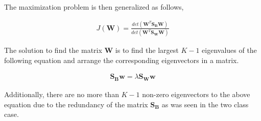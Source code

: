 \documentclass[11pt, a4paper]{article}
\begin{document}
The maximization problem is then generalized as follows,

\begin{align*}
	J(\boldsymbol{W}) = \frac{det(\boldsymbol{W}^T \boldsymbol{S_B} \boldsymbol{W})}{det(\boldsymbol{W}^T \boldsymbol{S_W} \boldsymbol{W})} 
\end{align*}

The solution to find the matrix $\boldsymbol{W}$ is to find the largest $K-1$ eigenvalues of the following equation and arrange the corresponding eigenvectors in a matrix. 

\begin{align*}
	\boldsymbol{S_B}\boldsymbol{w} = \lambda \boldsymbol{S_W}\boldsymbol{w} 
\end{align*}    

Additionally, there are no more than $K-1$ non-zero eigenvectors to the above 
equation due to the redundancy of the matrix $\boldsymbol{S_B}$ as was seen in the two class case.
 
\end{document}
